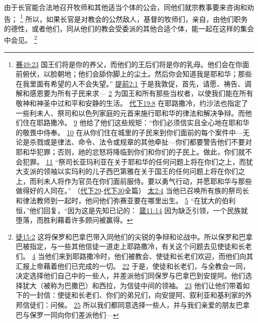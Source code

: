 \documentclass[12pt, a4paper, oneside]{ctexart}
\newcounter{parnum}[section]
\newcommand{\N}{%
   \noindent\refstepcounter{parnum}%
    \makebox[\parindent][l]{\textbf{\arabic{parnum}.}}}
\begin{document}
\N 由于长官能合法地召开牧师和其他适当个体的公会，同他们就宗教事要来咨询和劝告；
	\footnote {
		\href{https://biblehub.com/isaiah/49-23.htm}{赛49:23} 国王们将是你的养父，而他们的王后们将是你的乳母。他们会在你面前俯伏，以脸朝地；他们会舔你脚上的尘土。然后你会知道我是耶和华；那些在我里面有希望的人不会失望。”
		\href{https://biblehub.com/1_timothy/2-1.htm}{提前2:1} 于是我敦促，首先，请愿、祷告、调解和感恩要为所有子民来求---
		\href{https://biblehub.com/1_timothy/2-2.htm}{2} 为国王和所有那些当权者，以使我们能在所有敬神和神圣中过和平和安静的生活。
		\href{https://biblehub.com/2_chronicles/19-8.htm}{代下19:8} 在耶路撒冷，约沙法也指定了一些利未人、祭司和以色列家庭的元首来施行耶和华的律法和解决争辩。而他们住在耶路撒冷。
		\href{https://biblehub.com/2_chronicles/19-9.htm}{9} 他给了他们这些规矩：“你们必须信实且全心地在耶和华的敬畏中侍奉。
		\href{https://biblehub.com/2_chronicles/19-10.htm}{10} 在从你们住在城里的子民来到你们面前的每个案件中---无论是杀戮或是律法、命令、法令或规章的其他牵扯---你们都要警告他们不要对耶和华犯罪；否则，祂的忿怒将降临到你们和你们的子民上。做此，你们就不会犯罪。
		\href{https://biblehub.com/2_chronicles/19-11.htm}{11} “祭司长亚玛利亚在关于耶和华的任何问题上将在你们之上，而犹大支派的领袖以实玛利的儿子西巴第雅在关于国王的任何问题上将在你们之上，而利未人将作为官员在你们面前服侍。要以勇气行动，并愿耶和华与那些做得好的人同在。”
		（\href{https://biblehub.com/niv/2_chronicles/29.htm}{代下29}-\href{https://biblehub.com/niv/2_chronicles/30.htm}{代下30}全篇）
		\href{https://biblehub.com/matthew/2-4.htm}{太2:4} 当他已召唤所有族的祭司长和律法教师到一起时，他问他们弥赛亚要在哪里出生。
		\href{https://biblehub.com/matthew/2-5.htm}{5} “在犹大的伯利恒，”他们回复，“因为这是先知已记的：
		\href{https://biblehub.com/proverbs/11-14.htm}{箴11:14} 因为缺乏引领，一个民族就堕落，而胜利藉着许多顾问被赢得。
	}
	所以，如果长官是对教会的公然敌人，基督的牧师们，亲自，由他们职务的德性，或者他们，同从他们的教会受委派的其他合适个体，能一起在这样的集会中会见。
	\footnote {
		\href{https://biblehub.com/acts/15-2.htm}{徒15:2} 这将保罗和巴拿巴带入同他们的尖锐的争辩和论战中。所以保罗和巴拿巴被指定，与一些其他信徒一道走上耶路撒冷，有关这个问题去见使徒和长老们。
		\href{https://biblehub.com/acts/15-4.htm}{4} 当他们来到耶路撒冷时，他们被教会、使徒和长老们欢迎，而他们向其汇报上帝藉着他们已完成的一切。
		\href{https://biblehub.com/acts/15-22.htm}{22} 于是，使徒和长老们，与全教会一同，决定选择他们自己中的一些人，并差派他们同保罗与巴拿巴到安提阿。他们选择犹大（被称为巴撒巴）和西拉，为信徒中间的领袖。
		\href{https://biblehub.com/acts/15-23.htm}{23} 他们让他们带着如下的一封信：使徒和长老们、你们的弟兄们，向安提阿、叙利亚和基利家的外邦信徒们：问候。
		\href{https://biblehub.com/acts/15-25.htm}{25} 所以我们都同意选择一些人，并与我们亲爱的朋友巴拿巴与保罗一同向你们差派他们---
	}
\end{document}
